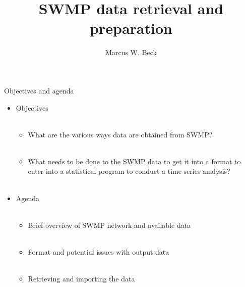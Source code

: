 \documentclass[xcolor=svgnames]{beamer}\usepackage[]{graphicx}\usepackage[]{color}
\begin{document}
\title[Overview of SWMP data]{SWMP data retrieval and preparation}

\author[M. Beck]{Marcus W. Beck}

\date{}




\begin{frame}{Objectives and agenda}
\begin{itemize}
\onslide<+->
\item Objectives \\~\\
\begin{itemize}
\item What are the various ways data are obtained from SWMP? \\~\\
\item What needs to be done to the SWMP data to get it into a format to enter into a statistical program to conduct a time series analysis? \\~\\
\end{itemize}
\onslide<+->
\item Agenda \\~\\
\begin{itemize}
\item Brief overview of SWMP network and available data \\~\\
\item Format and potential issues with output data \\~\\
\item Retrieving and importing the data \\~\\
\end{itemize}
\end{itemize}
\end{frame}
\end{document}
